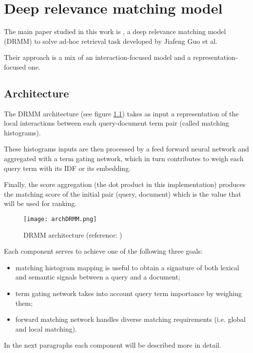 \newpage
\chapter{Deep relevance matching model}
\label{chap:drmm}

The main paper studied in this work is \cite{drmm}, a deep relevance
matching model (DRMM) to solve ad-hoc retrieval task developed by
Jiafeng Guo et al.

Their approach is a mix of an interaction-focused model and a
representation-focused one.

\section{Architecture}

The DRMM architecture (see figure \ref{fig:drmm_arch}) takes as input a representation of the local interactions between each query-document term pair (called matching histograms).

These histograms inputs are then processed by a feed forward neural network and aggregated with a term gating network, which in turn contributes to weigh each query term with its IDF or its embedding.

Finally, the score aggregation (the dot product in this implementation) produces the matching score of the initial pair (query, document) which is the value that will be used for ranking.

\begin{figure}
  \centering
  \texttt{[image: archDRMM.png]}
  \caption{DRMM architecture (reference: \cite{drmm})}
  \label{fig:drmm_arch}
\end{figure}

Each component serves to achieve one of the following three goals:

\begin{itemize}
\item matching histogram mapping is useful to obtain a signature of
both lexical and semantic signals between a query and a document;
\item term gating network takes into account query term importance by weighing them;
\item forward matching network handles diverse matching requirements (i.e. global and local matching).
\end{itemize}

In the next paragraphs each component will be described more in detail.

